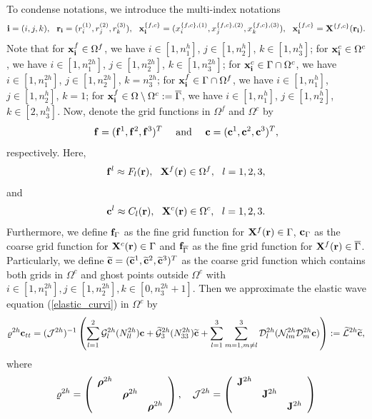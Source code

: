  To condense notations, we introduce the multi-index notations
\[{\bf i} = (i,j,k),\ \ {\bf r}_{\bf i} = (r^{(1)}_i,r^{(2)}_j,r^{(3)}_k),\ \ {\bf x}^{\{f,c\}}_{\bf i} = (x^{\{f,c\},(1)}_i,x^{\{f,c\},(2)}_j,x^{\{f,c\},(3)}_k),\ \ {\bf x}_{\bf i}^{\{f,c\}} = {\bf X}^{\{f,c\}}({\bf r}_{\bf i}).\]
Note that for ${\bf x}^f_{\bf i}\in\Omega^f$, we have $i\in[1,n_1^h]$, $j\in[1,n_2^h]$, $k\in[1,n_3^h]$; for ${\bf x}^c_{\bf i}\in\Omega^c$, we have $i\in[1,n_1^{2h}]$, $j\in[1,n_2^{2h}]$, $k\in[1,n_3^{2h}]$; for ${\bf x}_{\bf i}^c \in \Gamma\cap\Omega^c$, we have $i\in[1,n_1^{2h}]$, $j\in[1,n_2^{2h}]$, $k = n_3^{2h}$; for ${\bf x}_{\bf i}^f \in \Gamma\cap\Omega^f$, we have $i\in[1,n_1^h]$, $j\in[1,n_2^h]$, $k = 1$; for ${\bf x}_{\bf i}^f\in \Omega \setminus \Omega^c := \overline{\Gamma}$, we have $i\in[1,n_1^h]$, $j\in[1,n_2^h]$, $k\in[2,n_3^h]$. %
Now, denote the grid functions in $\Omega^f$ and $\Omega^c$ by
\[{\bf f} = ({\bf f}^1, {\bf f}^2, {\bf f}^3)^T\ \ \ \ \mbox{and}\ \ \ \  {\bf c} = ({\bf c}^1, {\bf c}^2, {\bf c}^3)^T,\]
respectively. Here, 
\[{\bf f}^l\approx F_l({\bf r}), \ \ {\bf X}^f({\bf r})\in\Omega^f,\ \ l=1,2,3 ,\]
and
\[{\bf c}^l \approx C_l({\bf r}),\ \ {\bf X}^c({\bf r})\in\Omega^c, \ \ l = 1,2,3.\]
Furthermore, we define ${\bf f}_{\Gamma}$ as the fine grid function for ${\bf X}^f({{\bf r}})\in\Gamma$, ${\bf c}_{\Gamma}$ as the coarse grid function for ${\bf X}^c({{\bf r}})\in\Gamma$ and ${\bf f}_{\overline{\Gamma}}$ as the fine grid function for ${\bf X}^f({{\bf r}})\in\overline{\Gamma}$. Particularly, we define $\widetilde{\bf c} = (\widetilde{\bf c}^1,\widetilde{\bf c}^2,\widetilde{\bf c}^3)^T$ as the coarse grid function which contains both grids in $\Omega^c$ and ghost points outside $\Omega^c$ with $i\in[1,n_1^{2h}], j\in[1,n_2^{2h}], k\in[0,n_3^{2h}+1]$. Then we approximate the elastic wave equation (\ref{elastic_curvi}) in $\Omega^c$ by
\begin{equation}\label{elastic_semi_c}
{\varrho}^{2h} {\bf c}_{tt} =( \mathcal{ J}^{2h})^{-1}\left(\sum_{l=1}^2\mathcal{G}_l^{2h}({N}_{ll}^{2h}){\bf c}+\wt{\mathcal{G}}_3^{2h}({N}_{33}^{2h}){\wt{\bf c}}+\sum_{l=1}^3\sum_{m=1,m\neq l}^3\mathcal{D}_l^{2h}(\mathcal{N}_{lm}^{2h}\mathcal{D}_m^{2h}{\bf c})\right) := \wt{\mathcal{L}}^{2h} {\wt {\bf c}},
\end{equation}
where 
\begin{align}\label{rho_j}
\varrho^{2h} = \left(\begin{array}{ccc}
{\bm \rho}^{2h}& ~  & ~ \\
~ & {\bm \rho}^{2h} & ~ \\
~ &~  &{\bm \rho}^{2h}\end{array}\right),\ \ \ \mathcal{J}^{2h} = \left(\begin{array}{ccc}
{\bf J}^{2h}& ~  & ~ \\
~ & {\bf J}^{2h} & ~ \\
~ &~  &{\bf J}^{2h}\end{array}\right)
\end{align}
